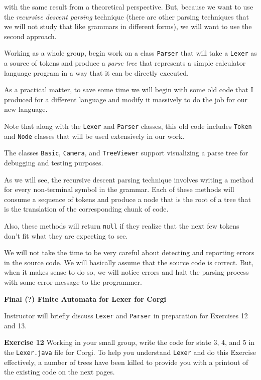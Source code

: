 with the same result from a theoretical perspective.
But, because we want to use the {\it recursive descent parsing\/} technique (there are other
parsing techniques that we will not study that like grammars in different forms),
we will want to use the second approach.
\medskip
\Outdent

\border

\doit Working as a whole group, begin work on a class {\tt Parser} that will take
a {\tt Lexer} as a source of tokens and produce a {\it parse tree\/} that represents a simple calculator
language program in a way that it can be directly executed.
\medskip

As a practical matter, to save some time
we will begin with some old code that I produced for a different language and modify it massively
to do the job for our new language.
\medskip

Note that along with the {\tt Lexer} and {\tt Parser} classes, this old code includes {\tt Token} and
{\tt Node} classes that will be used extensively in our work.
\medskip

The classes {\tt Basic}, {\tt Camera}, and {\tt TreeViewer} support visualizing a parse tree for
debugging and testing purposes.
\medskip
\Outdent

As we will see, the recursive descent parsing technique involves writing a method for every non-terminal
symbol in the grammar.  Each of these methods will consume a sequence of tokens and produce a
node that is the root of a tree that is the translation of the corresponding chunk of code.
\medskip

Also, these methods will return {\tt null} if they realize that the next few tokens don't fit what they are
expecting to see.  
\medskip

We will not take the time to be very careful about detecting and reporting errors in the source code.
We will basically assume that the source code is correct.  But, when it makes sense to do so, we will
notice errors and halt the parsing process with some error message to the programmer.
\border

\vfil\eject

{\bf Final (?) Finite Automata for Lexer for Corgi}
\bigskip

\border

\doit Instructor will briefly discuss {\tt Lexer} and {\tt Parser} in preparation for Exercises 12 and 13.
\border

{\bf Exercise 12}
Working in your small group, write the code for state 3, 4, and 5 in the {\tt Lexer.java} file for Corgi.
To help you understand {\tt Lexer} and do this Exercise effectively, a number of trees have been
killed to provide you with a printout of the existing code on the next pages.
\vfil\eject

